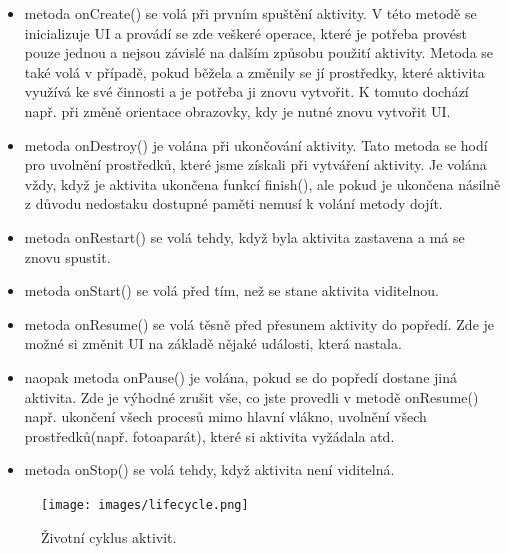 \documentclass[12pt]{article}
\begin{document}
\begin{itemize}
\item metoda onCreate() se volá při prvním spuštění aktivity. V této metodě se inicializuje UI a provádí se zde veškeré operace, které je potřeba provést pouze jednou a nejsou závislé na dalším způsobu použití aktivity. Metoda se také volá v případě, pokud běžela a změnily se jí prostředky, které aktivita využívá ke své činnosti a je potřeba ji znovu vytvořit. K tomuto dochází např. při změně orientace obrazovky, kdy je nutné znovu vytvořit UI.
\item metoda onDestroy() je volána při ukončování aktivity. Tato metoda se hodí pro uvolnění prostředků, které jsme získali při vytváření aktivity. Je volána vždy, když je aktivita ukončena funkcí finish(), ale pokud je ukončena násilně z důvodu nedostaku dostupné paměti nemusí k volání metody dojít.
\item metoda onRestart() se volá tehdy, když byla aktivita zastavena a má se znovu spustit.
\item metoda onStart() se volá před tím, než se stane aktivita viditelnou.
\item metoda onResume() se volá těsně před přesunem aktivity do popředí. Zde je možné si změnit UI na základě nějaké události, která nastala.
\item naopak metoda onPause() je volána, pokud se do popředí dostane jiná aktivita. Zde je výhodné zrušit vše, co jste provedli v metodě onResume() např. ukončení všech procesů mimo hlavní vlákno, uvolnění všech prostředků(např. fotoaparát), které si aktivita vyžádala atd.
\item metoda onStop() se volá tehdy, když aktivita není viditelná.
\end{itemize}
\newpage
\begin{figure}[ht]
\centerline{\texttt{[image: images/lifecycle.png]}}
\caption{Životní cyklus aktivit.} \label{lifecycle}
\end{figure}
\end{document}
